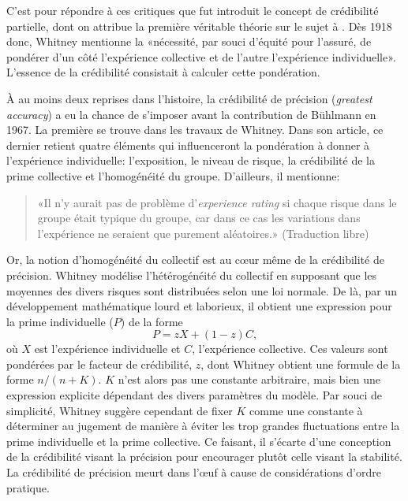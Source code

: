 C'est pour répondre à ces critiques que fut introduit le concept de
crédibilité partielle, dont on attribue la première véritable théorie
sur le sujet à \cite{Whitney:1918}. Dès 1918 donc, Whitney mentionne la
«nécessité, par souci d'équité pour l'assuré, de pondérer d'un côté
l'expérience collective et de l'autre l'expérience individuelle».
L'essence de la crédibilité consistait à calculer cette pondération.

À au moins deux reprises dans l'histoire, la crédibilité de précision
(\emph{greatest accuracy}) a eu la chance de s'imposer avant la
contribution de Bühlmann en 1967. La première se trouve dans les
travaux de Whitney. Dans son article, ce dernier retient quatre
éléments qui influenceront la pondération à donner à l'expérience
individuelle: l'exposition, le niveau de risque, la crédibilité de la
prime collective et l'homogénéité du groupe. D'ailleurs, il mentionne:

\begin{quote}
  «Il n'y aurait pas de problème d'\emph{experience rating} si chaque
  risque dans le groupe était typique du groupe, car dans ce cas les
  variations dans l'expérience ne seraient que purement aléatoires.»
  (Traduction libre)
\end{quote}

Or, la notion d'homogénéité du collectif est au c{\oe}ur même de la
crédibilité de précision. Whitney modélise l'hétérogénéité du
collectif en supposant que les moyennes des divers risques sont
distribuées selon une loi normale. De là, par un développement
mathématique lourd et laborieux, il obtient une expression pour la
prime individuelle ($P$) de la forme
\begin{equation*}
  P = z X + (1 - z) C,
\end{equation*}
où $X$ est l'expérience individuelle et $C$, l'expérience collective.
Ces valeurs sont pondérées par le facteur de crédibilité, $z$, dont
Whitney obtient une formule de la forme $n/(n + K)$. $K$ n'est alors
pas une constante arbitraire, mais bien une expression explicite
dépendant des divers paramètres du modèle. Par souci de simplicité,
Whitney suggère cependant de fixer $K$ comme une constante à
déterminer au jugement de manière à éviter les trop grandes
fluctuations entre la prime individuelle et la prime collective. Ce
faisant, il s'écarte d'une conception de la crédibilité visant la
précision pour encourager plutôt celle visant la stabilité. La
crédibilité de précision meurt dans l'{\oe}uf à cause de
considérations d'ordre pratique.

